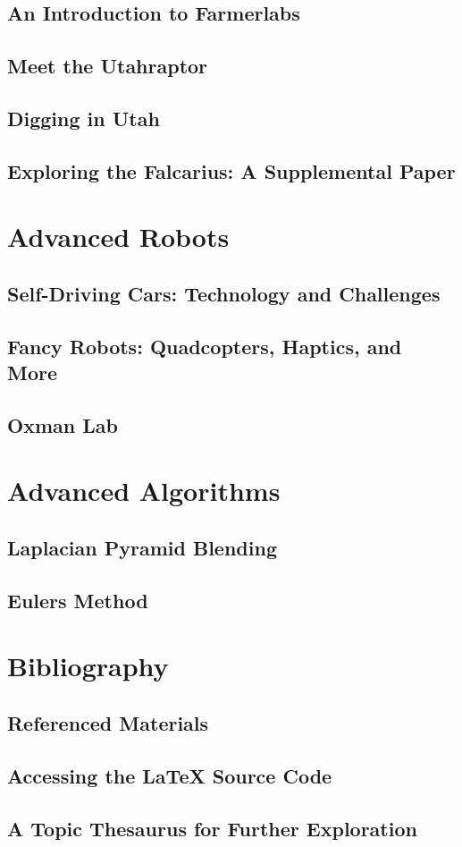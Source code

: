 \section{An Introduction to Farmerlabs}
\section{Meet the Utahraptor}
\section{Digging in Utah}
\section{Exploring the Falcarius: A Supplemental Paper}

\chapter{Advanced Robots}
\section{Self-Driving Cars: Technology and Challenges}
\section{Fancy Robots: Quadcopters, Haptics, and More}
\section{Oxman Lab}

\chapter{Advanced Algorithms}
\section{Laplacian Pyramid Blending}
\section{Eulers Method}

\chapter{Bibliography}
\section{Referenced Materials}
\section{Accessing the LaTeX Source Code}
\section{A Topic Thesaurus for Further Exploration}
